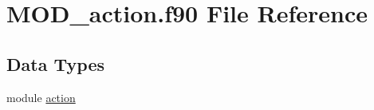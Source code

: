 \hypertarget{MOD__action_8f90}{\section{M\-O\-D\-\_\-action.\-f90 File Reference}
\label{MOD__action_8f90}
}
\subsection*{Data Types}
\begin{DoxyCompactItemize}
\item 
module \hyperlink{classaction}{action}
\end{DoxyCompactItemize}
